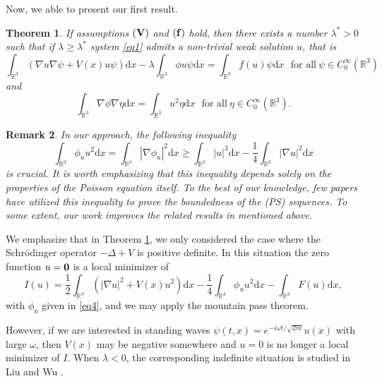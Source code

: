 \documentclass[12pt]{amsart}
\numberwithin{equation}{section}
\newtheorem{theorem}{Theorem}[section]
\newtheorem{remark}[theorem]{Remark}
\theoremstyle{definition}
\begin{document}
Now, we able to present our first result.
\begin{theorem}\label{thm} If assumptions ${\bf (V)}$ and ${\bf (f)}$ hold, then there exists a number $\lambda^*>0$ such that if $\lambda\geq \lambda^*$  system \eqref{eq1} admits a non-trivial weak solution $u$, that is
	\begin{equation*}
			\int_{\mathbb R^3}\left(\nabla u\nabla\psi +V(x)u\psi \right)\text{d}x-\lambda \int_{\mathbb R^3} \phi u\psi \text{d}x=\int_{\mathbb R^3}f(u)\psi \text{d}x\ \ ~\text{for~all}~\psi\in C_0^\infty(\mathbb R^3)
	\end{equation*}
and
	\begin{equation*}
	\int_{\mathbb R^3}\nabla \phi\nabla \eta \text{d}x=\int_{\mathbb R^3}u^2\eta \text{d}x\ \ ~\text{for~all}~\eta\in C_0^\infty(\mathbb R^3).
\end{equation*}
	\end{theorem}

\begin{remark}{\rm
In our approach, the following inequality
$$\int_{\mathbb R^3}\phi_uu^2\text{d}x=\int_{\mathbb R^3}|\nabla\phi_{u}|^2\text{d}x\geq\int_{\mathbb R^3}|u|^3\text{d}x-\frac{1}{4}\int_{\mathbb R^3}|\nabla u|^2\text{d}x$$
is crucial. It is worth emphasizing that this inequality depends solely on the properties of the Poisson equation itself. To the best of our knowledge, few papers have utilized this inequality to prove the boundedness of the (PS) sequences. To some extent, our work  improves the related results in \cite{MR2810583,MR3148130} mentioned above.}
\end{remark}

We emphasize that in Theorem \ref{thm}, we
only considered the case where the Schr\"{o}dinger operator $-\Delta+V$ is positive definite. In this
situation the zero function $u={\bf 0}$ is a local minimizer of 
\begin{equation}\label{IDEF}
I(u)=\frac{1}{2}\int_{\mathbb R^3}\left(|\nabla u|^2+V(x)u^2\right)\text{d}x-\frac{1}{4}\int_{\mathbb R^3}\phi_{u} u^2\text{d}x-\int_{\mathbb R^3}F(u)\text{d}x,
\end{equation}
with $\phi_u$ given in \eqref{eq4}, and we may apply the mountain pass theorem.

However, if we are interested in standing waves $\psi(t,x)=e^{-i\omega t/\sqrt{2m}}u(x)$ with large $\omega$, then $V(x)$ may be negative somewhere and $u=  0$ is no longer a local minimizer of $I$. When $\lambda<0$, the corresponding indefinite
situation is studied in Liu and Wu \cite{MR3656292}.
\end{document}
